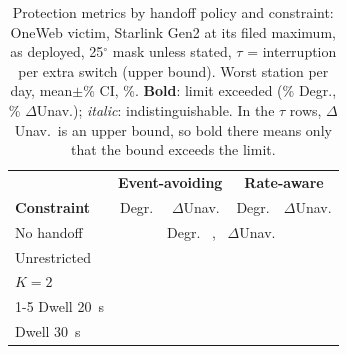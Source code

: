 \documentclass[conference]{IEEEtran}
\newcommand{\vcell}[3]{%
  \ifdim\dimexpr #1pt-#2pt\relax>#3pt\relax\textbf{#1$\pm$#2}%
  \else\ifdim\dimexpr #1pt+#2pt\relax<#3pt\relax#1$\pm$#2%
  \else\textit{#1$\pm$#2}\fi\fi}
\begin{document}
\begin{table}[t]
\caption{Protection metrics by handoff policy and constraint: OneWeb victim,
Starlink Gen2 at its filed maximum, as deployed, 25$^\circ$ mask unless stated,
$\tau$ = interruption per extra switch (upper bound). Worst station per day,
mean$\pm$\CiPct\% CI, \%. \textbf{Bold}: limit exceeded (\DegradeLimitPct\%
Degr., \UnavailLimitPct\% $\Delta$Unav.); \textit{italic}: indistinguishable. In
the $\tau$ rows, $\Delta$Unav.\ is an upper bound, so bold there means only that the
bound exceeds the limit.}
\label{tab:handoff}
\centering
\scriptsize
\setlength{\tabcolsep}{1.6pt}
\renewcommand{\arraystretch}{1.15}
\begin{tabular}{lcccc}
\toprule
\rowcolor{headblue}
 & \multicolumn{2}{c}{\textbf{Event-avoiding}} & \multicolumn{2}{c}{\textbf{Rate-aware}}\\
\rowcolor{headblue}
\textbf{Constraint} & Degr. & $\Delta$Unav. & Degr. & $\Delta$Unav.\\
\midrule
\rowcolor{rowgray}
No handoff & \multicolumn{4}{c}{Degr.\ \vcell{\DepGenTwoNoHoDegrPct}{\DepGenTwoNoHoDegrCi}{\DegradeLimitPct}, \ $\Delta$Unav.\ \vcell{\DepGenTwoNoHoUnavPct}{\DepGenTwoNoHoUnavCi}{\UnavailLimitPct}}\\
\midrule
Unrestricted & \vcell{\DepGenTwoEvAvDegrPct}{\DepGenTwoEvAvDegrCi}{\DegradeLimitPct} & \vcell{\DepGenTwoEvAvUnavPct}{\DepGenTwoEvAvUnavCi}{\UnavailLimitPct} & \vcell{\DepGenTwoRateMaxDegrPct}{\DepGenTwoRateMaxDegrCi}{\DegradeLimitPct} & \vcell{\DepGenTwoRateMaxUnavPct}{\DepGenTwoRateMaxUnavCi}{\UnavailLimitPct}\\
$K{=}2$ & \vcell{\DepKTwoDegrPct}{\DepKTwoDegrCi}{\DegradeLimitPct} & \vcell{\DepKTwoUnavPct}{\DepKTwoUnavCi}{\UnavailLimitPct} & \vcell{\DepRateMaxKTwoDegrPct}{\DepRateMaxKTwoDegrCi}{\DegradeLimitPct} & \vcell{\DepRateMaxKTwoUnavPct}{\DepRateMaxKTwoUnavCi}{\UnavailLimitPct}\\
\cmidrule(lr){1-5}
Dwell 20~s & \vcell{\DepDwellEvAvNTwentyDegrPct}{\DepDwellEvAvNTwentyDegrCi}{\DegradeLimitPct} & \vcell{\DepDwellEvAvNTwentyUnavPct}{\DepDwellEvAvNTwentyUnavCi}{\UnavailLimitPct} & \vcell{\DepDwellRateMaxNTwentyDegrPct}{\DepDwellRateMaxNTwentyDegrCi}{\DegradeLimitPct} & \vcell{\DepDwellRateMaxNTwentyUnavPct}{\DepDwellRateMaxNTwentyUnavCi}{\UnavailLimitPct}\\
Dwell 30~s & \vcell{\DepDwellEvAvNThirtyDegrPct}{\DepDwellEvAvNThirtyDegrCi}{\DegradeLimitPct} & \vcell{\DepDwellEvAvNThirtyUnavPct}{\DepDwellEvAvNThirtyUnavCi}{\UnavailLimitPct} & \vcell{\DepDwellRateMaxNThirtyDegrPct}{\DepDwellRateMaxNThirtyDegrCi}{\DegradeLimitPct} & \vcell{\DepDwellRateMaxNThirtyUnavPct}{\DepDwellRateMaxNThirtyUnavCi}{\UnavailLimitPct}\\

\end{tabular}
\end{table}
\end{document}
